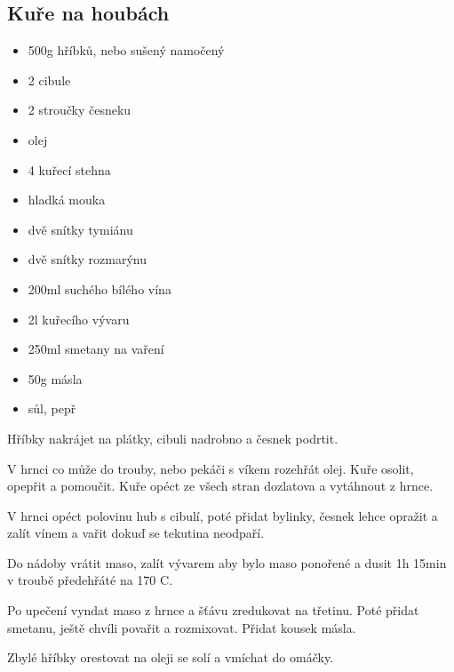 \documentclass[10pt,a4paper]{article}
\newenvironment{myitemize}
{ \begin{itemize}
    \setlength{\itemsep}{0pt}
    \setlength{\parskip}{0pt}
    \setlength{\parsep}{0pt}     }
{ \end{itemize}                  }
\begin{document}
\subsection{Kuře na houbách}
\begin{minipage}[t]{0,5\textwidth}
\begin{myitemize} 
\item 500g hříbků, nebo sušený namočený
\item 2 cibule
\item 2 stroučky česneku
\item olej
\item 4 kuřecí stehna
\item hladká mouka
\item dvě snítky tymiánu
\item dvě snítky rozmarýnu
\item 200ml suchého bílého vína
\item 2l kuřecího vývaru
\item 250ml smetany na vaření
\item 50g másla
\item sůl, pepř
\end{myitemize}
\end{minipage}
\begin{minipage}[t]{0,5\textwidth}
Hříbky nakrájet na plátky, cibuli nadrobno a česnek podrtit.

V hrnci co může do trouby, nebo pekáči s víkem rozehřát olej. Kuře osolit, opepřit a pomoučit. Kuře opéct ze všech stran dozlatova a vytáhnout z hrnce.

V hrnci opéct polovinu hub s cibulí, poté přidat bylinky, česnek lehce opražit a zalít vínem a vařit dokuď se tekutina neodpaří.

Do nádoby vrátit maso, zalít vývarem aby bylo maso ponořené a dusit 1h 15min v troubě předehřáté na 170 \degree C.

Po upečení vyndat maso z hrnce a šťávu zredukovat na třetinu. Poté přidat smetanu, ještě chvíli povařit a rozmixovat. Přidat kousek másla.

Zbylé hříbky orestovat na oleji se solí a vmíchat do omáčky.
\end{minipage}
\end{document}
